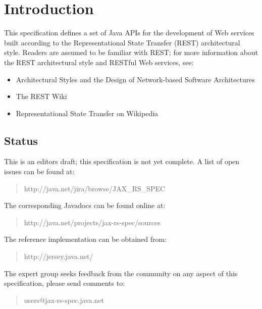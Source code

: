 \chapter{Introduction}

This specification defines a set of Java APIs for the development of Web services built according to the Representational State Transfer\cite{rest} (REST) architectural style. Readers are assumed to be familiar with 
REST; for more information about the REST architectural style and RESTful Web services, see:

\begin{itemize}
\item Architectural Styles and the Design of Network-based Software Architectures\cite{rest}
\item The REST Wiki\cite{restwiki}
\item Representational State Transfer on Wikipedia\cite{restwikipedia}
\end{itemize}

\section{Status}
\label{status}

This is an editors draft; this specification is not yet complete. A list of open issues can be found at:

\begin{quote}
http://java.net/jira/browse/JAX\_RS\_SPEC
\end{quote}

The corresponding Javadocs can be found online at:

\begin{quote}
http://java.net/projects/jax-rs-spec/sources
\end{quote}

The reference implementation can be obtained from:

\begin{quote}
http://jersey.java.net/
\end{quote}

The expert group seeks feedback from the community on any aspect of this specification, please send comments to:

\begin{quote}
users@jax-rs-spec.java.net
\end{quote}

